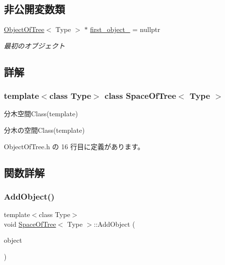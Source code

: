 \subsection*{非公開変数類}
\begin{DoxyCompactItemize}
\item 
\mbox{\hyperlink{class_object_of_tree}{Object\+Of\+Tree}}$<$ Type $>$ $\ast$ \mbox{\hyperlink{class_space_of_tree_af47684080d10ec625f1ebbf6492bf99a}{first\+\_\+object\+\_\+}} = nullptr
\begin{DoxyCompactList}\small\item\em 最初のオブジェクト \end{DoxyCompactList}\end{DoxyCompactItemize}


\subsection{詳解}
\subsubsection*{template$<$class Type$>$\newline
class Space\+Of\+Tree$<$ Type $>$}

分木空間\+Class(template) 

分木の空間\+Class(template) 

 Object\+Of\+Tree.\+h の 16 行目に定義があります。



\subsection{関数詳解}
\mbox{\label{class_space_of_tree_a8156722056d7b2ab354ff22235772d7e}} 
\subsubsection{\texorpdfstring{Add\+Object()}{AddObject()}}
{\footnotesize\ttfamily template$<$class Type$>$ \\
void \mbox{\hyperlink{class_space_of_tree}{Space\+Of\+Tree}}$<$ Type $>$\+::Add\+Object (\begin{DoxyParamCaption}\item[{\mbox{\hyperlink{class_object_of_tree}{Object\+Of\+Tree}}$<$ Type $>$ $\ast$}]{object }\end{DoxyParamCaption})\hspace{0.3cm}{\ttfamily [inline]}}



